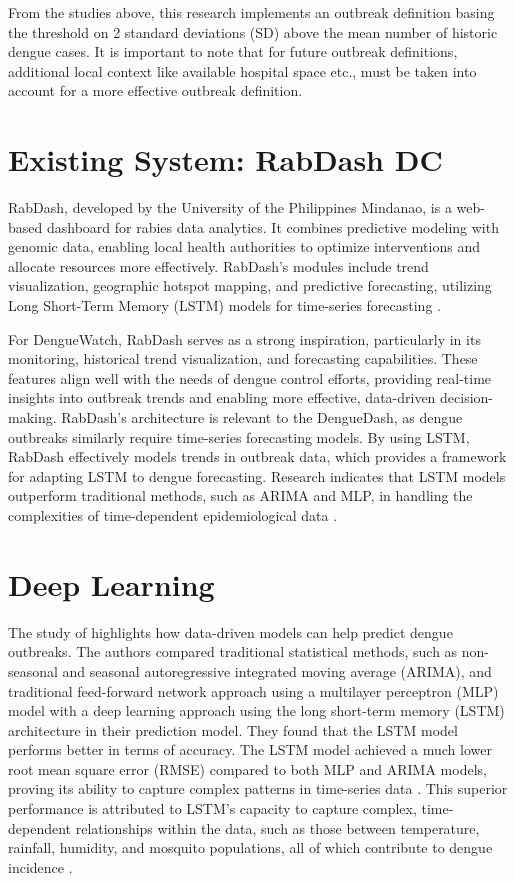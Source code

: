 From the studies above, this research implements an outbreak definition basing the threshold on 2 standard deviations (SD) above the mean number of historic dengue cases. It is important to note that for future outbreak definitions, additional local context like available hospital space etc., must be taken into account for a more effective outbreak definition.


\section{Existing System: RabDash DC}
%
%
RabDash, developed by the University of the Philippines Mindanao, is a web-based dashboard for rabies data analytics. It combines predictive modeling with genomic data, enabling local health authorities to optimize interventions and allocate resources more effectively. RabDash's modules include trend visualization, geographic hotspot mapping, and predictive forecasting, utilizing Long Short-Term Memory (LSTM) models for time-series forecasting \cite{rabdash}.

For DengueWatch, RabDash serves as a strong inspiration, particularly in its monitoring, historical trend visualization, and forecasting capabilities. These features align well with the needs of dengue control efforts, providing real-time insights into outbreak trends and enabling more effective, data-driven decision-making. RabDash’s architecture is relevant to the DengueDash, as dengue outbreaks similarly require time-series forecasting models. By using LSTM, RabDash effectively models trends in outbreak data, which provides a framework for adapting LSTM to dengue forecasting. Research indicates that LSTM models outperform traditional methods, such as ARIMA and MLP, in handling the complexities of time-dependent epidemiological data \cite{ligue2022deep}.


\section{Deep Learning}
The study of \cite{ligue2022deep} highlights how data-driven models can help predict dengue outbreaks. The authors compared traditional statistical methods, such as non-seasonal and seasonal autoregressive integrated moving average (ARIMA), and traditional feed-forward network approach using a multilayer perceptron (MLP) model with a deep learning approach using the long short-term memory (LSTM) architecture in their prediction model. They found that the LSTM model performs better in terms of accuracy. The LSTM model achieved a much lower root mean square error (RMSE) compared to both MLP and ARIMA models, proving its ability to capture complex patterns in time-series data \cite{ligue2022deep}. This superior performance is attributed to LSTM’s capacity to capture complex, time-dependent relationships within the data, such as those between temperature, rainfall, humidity, and mosquito populations, all of which contribute to dengue incidence \cite{ligue2022deep}.

